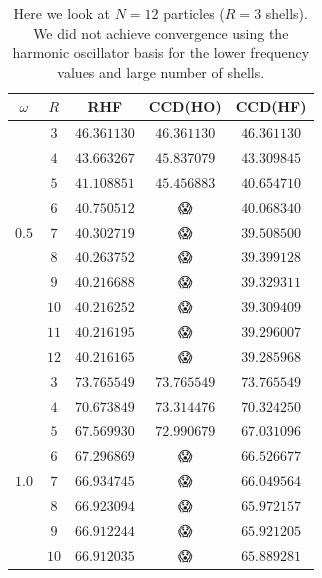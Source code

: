 \documentclass[
    a4paper, aps, twocolumn, floatfix, superscriptaddress,
    nofootinbib]{revtex4-1}
\newcommand{\nan}{\DejaSans 😱}
\newcommand{\1}{\mathds{1}}
\begin{document}
        \begin{table}
            \centering
            \caption{Here we look at $N = 12$ particles ($R = 3$ shells).  We did
            not achieve convergence using the harmonic oscillator basis for the
            lower frequency values and large number of shells.}
            \begin{ruledtabular}
                \begin{tabular}{c|c|ccc}
                    $\omega$ & $R$ & RHF & CCD(HO) & CCD(HF) \\
                    \hline
                          & $3$ & $46.361130$ & $46.361130$ & $46.361130$ \\
                          & $4$ & $43.663267$ & $45.837079$ & $43.309845$ \\
                          & $5$ & $41.108851$ & $45.456883$ & $40.654710$ \\
                          & $6$ & $40.750512$ & \nan & $40.068340$ \\
                    $0.5$ & $7$ & $40.302719$ & \nan & $39.508500$ \\
                          & $8$ & $40.263752$ & \nan & $39.399128$ \\
                          & $9$ & $40.216688$ & \nan & $39.329311$ \\
                          & $10$ & $40.216252$ & \nan & $39.309409$ \\
                          & $11$ & $40.216195$ & \nan & $39.296007$ \\
                          & $12$ & $40.216165$ & \nan & $39.285968$ \\
                    \hline
                          & $3$ & $73.765549$ & $73.765549$ & $73.765549$ \\
                          & $4$ & $70.673849$ & $73.314476$ & $70.324250$ \\
                          & $5$ & $67.569930$ & $72.990679$ & $67.031096$ \\
                          & $6$ & $67.296869$ & \nan & $66.526677$ \\
                    $1.0$ & $7$ & $66.934745$ & \nan & $66.049564$ \\
                          & $8$ & $66.923094$ & \nan & $65.972157$ \\
                          & $9$ & $66.912244$ & \nan & $65.921205$ \\
                          & $10$ & $66.912035$ & \nan & $65.889281$ \\

\end{tabular}
\end{ruledtabular}
\end{table}
\end{document}
